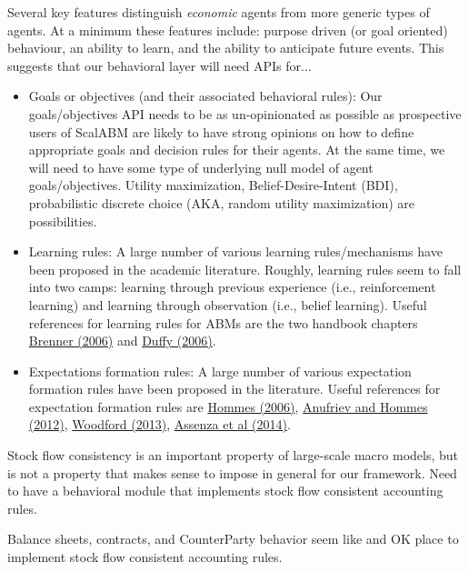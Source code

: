 \documentclass[11pt]{amsart}
\begin{document}
Several key features distinguish \textit{economic} agents from more generic types of agents. At a minimum these features include: purpose driven (or goal oriented) behaviour, an ability to learn, and the ability to anticipate future events. This suggests that our behavioral layer will need APIs for...
\begin{itemize}
    \item Goals or objectives (and their associated behavioral rules): Our goals/objectives API needs to be as un-opinionated as possible as prospective users of ScalABM are likely to have strong opinions on how to define appropriate goals and decision rules for their agents. At the same time, we will need to have some type of underlying null model of agent goals/objectives. Utility maximization, Belief-Desire-Intent (BDI), probabilistic discrete choice (AKA, random utility maximization) are possibilities.
    \item Learning rules: A large number of various learning rules/mechanisms have been proposed in the academic literature. Roughly, learning rules seem to fall into two camps: learning through previous experience (i.e., reinforcement learning) and learning through observation (i.e., belief learning). Useful references for learning rules for ABMs are the two handbook chapters \href{http://web.uvic.ca/~mingkang/econ353/project/Brenner.pdf}{Brenner (2006)} and \href{http://www.socsci.uci.edu/~duffy/papers/duffy2006.pdf}{Duffy (2006)}.
    \item Expectations formation rules: A large number of various expectation formation rules have been proposed in the literature. Useful references for expectation formation rules are \href{http://feb.kuleuven.be/fac/Slides_Degrauwe/HomHBchapter23.pdf}{Hommes (2006)}, \href{http://econ.columbia.edu/files/econ/content/hommes_background_material_2.pdf}{Anufriev and Hommes (2012)}, \href{http://www.columbia.edu/~mw2230/AREcon.pdf}{Woodford (2013)}, \href{http://www.emeraldinsight.com/doi/pdfplus/10.1108/S0193-230620140000017002}{Assenza et al (2014)}.
\end{itemize}

Stock flow consistency is an important property of large-scale macro models, but is not a property that makes sense to impose in general for our framework.  Need to have a behavioral module that implements stock flow consistent accounting rules.

Balance sheets, contracts, and CounterParty behavior seem like and OK place to implement stock flow consistent accounting rules.
\end{document}
